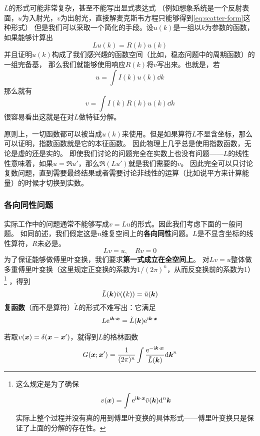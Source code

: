 \documentclass[UTF8, a4paper]{ctexart}
\newcommand*{\ii}{\mathrm{i}}
\newcommand*{\ee}{\mathrm{e}}
\begin{document}
$L$的形式可能非常复杂，甚至不能写出显式表达式
（例如想象系统是一个反射表面，$u$为入射光，$v$为出射光，直接解麦克斯韦方程只能够得到\eqref{eq:scatter-form}这种形式）
但是我们可以采取一个简化的手段。设$u(k)$是一组以$k$为参数的函数，如果能够计算出
\[
    L u(k) = R(k) u(k)
\]
并且证明$u(k)$构成了我们感兴趣的函数空间（比如，稳态问题中的周期函数）的一组完备基，
那么我们就能够使用响应$R(k)$将$v$写出来。也就是，若
\begin{equation}
    u = \int I(k) u(k) \dd k
\end{equation}
那么就有
\begin{equation}
    v = \int I(k) R(k) u(k) \dd k
\end{equation}
很容易看出这就是在对$L$做特征分解。

原则上，一切函数都可以被当成$u(k)$来使用。但是如果算符$L$不显含坐标，那么可以证明，指数函数就是它的本征函数。
因此物理上几乎总是使用指数函数，无论是虚的还是实的。
即使我们讨论的问题完全在实数上也没有问题——$L$的线性性意味着，如果$u = \Re u'$，那么$\Re (L u')$就是我们需要的$v$。
因此完全可以只讨论复数问题，直到需要最终结果或者需要讨论非线性的运算（比如说平方来计算能量）的时候才切换到实数。

\subsubsection{各向同性问题}
实际工作中的问题通常不能够写成$v=Lu$的形式。因此我们考虑下面的一般问题。
如同前述，我们假定这是$n$维复空间上的\textbf{各向同性}问题。$L$是不显含坐标的线性算符，$R$未必是。
\begin{equation}
    L v = u, \quad R v = 0
    \label{eq:response}
\end{equation}
为了保证能够做傅里叶变换，我们要求\textbf{第一式成立在全空间上}。
对$L v = u$整体做多重傅里叶变换（这里规定正变换的系数为$1/(2\pi)^n$，从而反变换前的系数为1）%
\footnote{这么规定是为了确保
\[
    v(\vb*{x}) = \int \ee^{\ii \vb*{k} \cdot \vb*{x}} \tilde{v}(\vb*{k}) \dd^n \vb*{k}
\]
实际上整个过程并没有真的用到傅里叶变换的具体形式——傅里叶变换只是保证了上面的分解的存在性。
}%
，得到
\[
    \tilde{L}(\vb*{k}) \tilde{v}(\vb*(k)) = \tilde{u}(\vb*{k})
\]
\textbf{复函数}（而不是算符）$\tilde{L}$的形式不难写出：它满足
\begin{equation}
    L \ee^{\ii \vb*{k} \cdot \vb*{x}} = \tilde{L}(\vb*{k}) \ee^{\ii \vb*{k} \cdot \vb*{x}}
\end{equation}

若取$v(\vb*{x})=\delta(\vb*{x} - \vb*{x}')$，就得到$L$的格林函数
\begin{equation}
    G(\vb*{x};\vb*{x}') = \frac{1}{(2\pi)^n} \int \frac{\ee^{ - \ii \vb*{k} \cdot \vb*{x}}}{\tilde{L}(\vb*{k})} \dd \vb*{k}^n
    \label{eq:green-response}
\end{equation}
\end{document}
